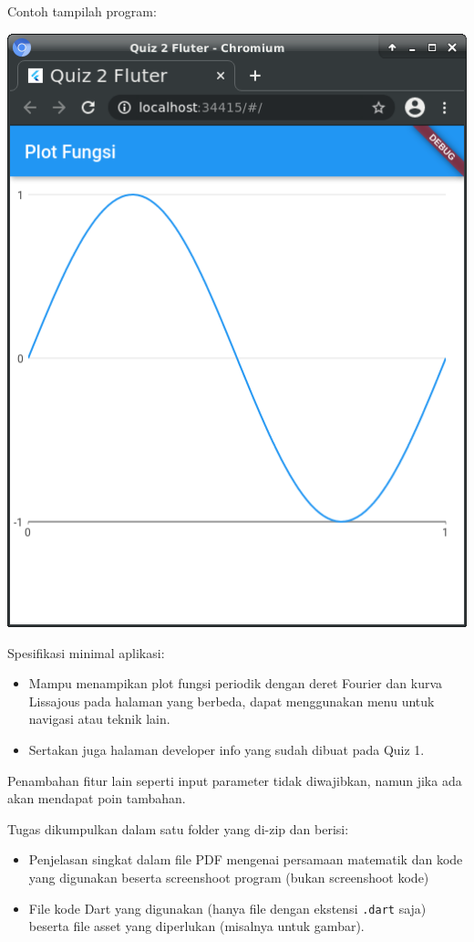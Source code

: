 \documentclass[a4paper,11pt]{article} %
\newcommand{\txtinline}[1]{\texttt{#1}}
\begin{document}
Contoh tampilah program:

{\center
\includegraphics[scale=0.5]{images/PlotSinus.png}
\par}

Spesifikasi minimal aplikasi:
\begin{itemize}
\item Mampu menampikan plot fungsi periodik dengan deret Fourier dan kurva Lissajous
pada halaman yang berbeda, dapat menggunakan menu untuk navigasi atau teknik lain.
\item Sertakan juga halaman developer info yang sudah dibuat pada Quiz 1.
\end{itemize}

Penambahan fitur lain seperti input parameter tidak diwajibkan, namun jika ada
akan mendapat poin tambahan.

Tugas dikumpulkan dalam satu folder yang di-zip dan berisi:
\begin{itemize}
\item Penjelasan singkat dalam file PDF mengenai persamaan matematik dan
kode yang digunakan beserta screenshoot
program (bukan screenshoot kode)
\item File kode Dart yang digunakan (hanya file dengan ekstensi \txtinline{.dart} saja) beserta
file asset yang diperlukan (misalnya untuk gambar).
\end{itemize}



\end{document}
